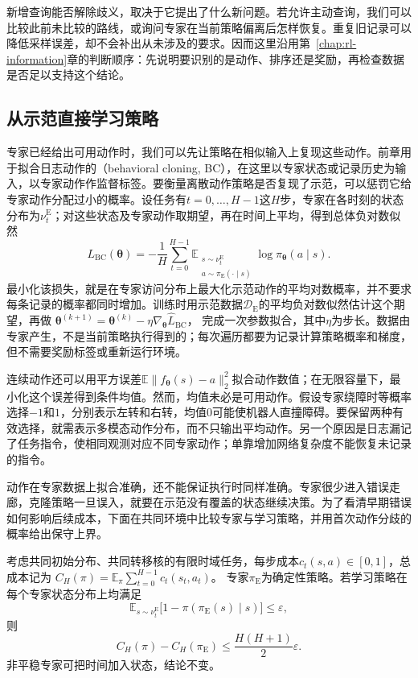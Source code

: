 新增查询能否解除歧义，取决于它提出了什么新问题。若允许主动查询，我们可以比较此前未比较的路线，或询问专家在当前策略偏离后怎样恢复。重复旧记录可以降低采样误差，却不会补出从未涉及的要求。因而这里沿用第~\ref{chap:rl-information}章的判断顺序：先说明要识别的是动作、排序还是奖励，再检查数据是否足以支持这个结论。

\subsection{从示范直接学习策略}
\label{sec:rl-reward-bc-dagger}

专家已经给出可用动作时，我们可以先让策略在相似输入上复现这些动作。前章用于拟合日志动作的（behavioral cloning, BC），在这里以专家状态或记录历史为输入，以专家动作作监督标签。要衡量离散动作策略是否复现了示范，可以惩罚它给专家动作分配过小的概率。设任务有$t=0,\ldots,H-1$这$H$步，专家在各时刻的状态分布为$\nu_t^{\mathrm E}$；对这些状态及专家动作取期望，再在时间上平均，得到总体负对数似然
\begin{equation}
  L_{\mathrm{BC}}(\bm{\theta})
  =-\frac1H\sum_{t=0}^{H-1}
  \mathbb E_{\substack{s\sim\nu_t^{\mathrm E}\\
              a\sim\pi_{\mathrm E}(\cdot\mid s)}}
       \log\pi_{\bm{\theta}}(a\mid s).
  \label{eq:rl-reward-bc}
\end{equation}
最小化该损失，就是在专家访问分布上最大化示范动作的平均对数概率，并不要求每条记录的概率都同时增加。训练时用示范数据$\mathcal D_{\mathrm E}$的平均负对数似然估计这个期望，再做
$\bm{\theta}^{(k+1)}=\bm{\theta}^{(k)}
-\eta\nabla_{\bm{\theta}}\widehat L_{\mathrm{BC}}$，
完成一次参数拟合，其中$\eta$为步长。数据由专家产生，不是当前策略执行得到的；每次遍历都要为记录计算策略概率和梯度，但不需要奖励标签或重新运行环境。

连续动作还可以用平方误差$\mathbb E\lVert f_{\bm{\theta}}(s)-a\rVert_2^2$拟合动作数值；在无限容量下，最小化这个误差得到条件均值。然而，均值未必是可用动作。假设专家绕障时等概率选择$-1$和$1$，分别表示左转和右转，均值$0$可能使机器人直撞障碍。要保留两种有效选择，就需表示多模态动作分布，而不只输出平均动作。另一个原因是日志漏记了任务指令，使相同观测对应不同专家动作；单靠增加网络复杂度不能恢复未记录的指令。

动作在专家数据上拟合准确，还不能保证执行时同样准确。专家很少进入错误走廊，克隆策略一旦误入，就要在示范没有覆盖的状态继续决策。为了看清早期错误如何影响后续成本，下面在共同环境中比较专家与学习策略，并用首次动作分歧的概率给出保守上界。

\begin{theorem}[行为克隆的首次分歧界]
  \label{thm:rl-reward-bc}
  考虑共同初始分布、共同转移核的有限时域任务，每步成本$c_t(s,a)\in[0,1]$，总成本记为
  $C_H(\pi)=\mathbb E_\pi\sum_{t=0}^{H-1}c_t(s_t,a_t)$。
  专家$\pi_{\mathrm E}$为确定性策略。若学习策略在每个专家状态分布上均满足
  \[
    \mathbb E_{s\sim\nu_t^{\mathrm E}}
    \bigl[1-\pi(\pi_{\mathrm E}(s)\mid s)\bigr]\leq\varepsilon,
  \]
  则
  \[
    C_H(\pi)-C_H(\pi_{\mathrm E})
    \leq \frac{H(H+1)}2\varepsilon.
  \]
  非平稳专家可把时间加入状态，结论不变。
\end{theorem}

